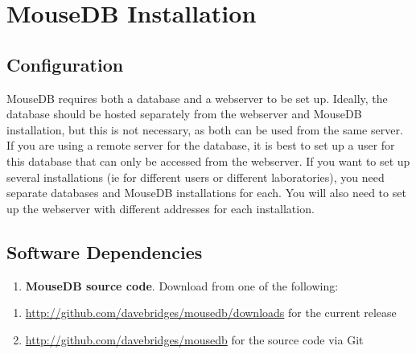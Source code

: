 \documentclass[letterpaper,10pt,english]{sphinxmanual}
\begin{document}
\resetcurrentobjects
\hypertarget{--doc-installation}{}

\chapter{MouseDB Installation}


\section{Configuration}

MouseDB requires both a database and a webserver to be set up.  Ideally, the database should be hosted separately from the webserver and MouseDB installation, but this is not necessary, as both can be used from the same server.  If you are using a remote server for the database, it is best to set up a user for this database that can only be accessed from the webserver.  If you want to set up several installations (ie for different users or different laboratories), you need separate databases and MouseDB installations for each.  You will also need to set up the webserver with different addresses for each installation.


\section{Software Dependencies}
\begin{enumerate}
\item {} 
\textbf{MouseDB source code}.  Download from one of the following:

\end{enumerate}
\begin{enumerate}
\item {} 
\href{http://github.com/davebridges/mousedb/downloads}{http://github.com/davebridges/mousedb/downloads} for the current release

\item {} 
\href{http://github.com/davebridges/mousedb}{http://github.com/davebridges/mousedb} for the source code via Git

\end{enumerate}
\end{document}
